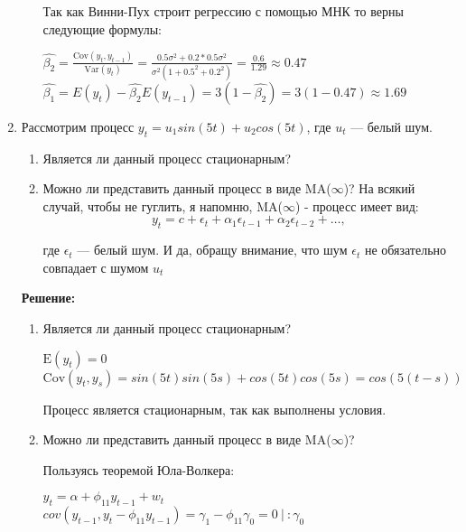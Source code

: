 \documentclass[a4paper,14pt]{article}
\begin{document}
\begin{enumerate}
\begin{enumerate}
Так как Винни-Пух строит регрессию с помощью МНК то верны следующие формулы:

\begin{center}
	\begin{spacing}{1.5}
		$\hat{\beta_2} = \frac{\text{Cov}(y_t,y_{t-1})}{\text{Var}(y_t)} = \frac{0.5\sigma^2+0.2*0.5\sigma^2}{\sigma^2(1+0.5^2+0.2^2)} = \frac{0.6}{1.29} \approx 0.47$\\
		$\hat{\beta_1} = E(y_t) - \hat{\beta_2}E(y_{t-1}) = 3(1-\hat{\beta_2}) = 3(1-0.47) \approx 1.69$

	\end{spacing}
\end{center}
\end{enumerate}
\item Рассмотрим процесс $y_t = u_1sin(5t) + u_2cos(5t)$, где $u_t$ — белый шум.
\begin{enumerate}
	\item Является ли данный процесс стационарным?
	\item Можно ли представить данный процесс в виде MA($\infty$)? На всякий случай, чтобы не гуглить, я напомню, MA($\infty$) - процесс имеет вид:
	$$y_t = c+\epsilon_t +\alpha_1\epsilon_{t−1} +\alpha_2\epsilon_{t−2} +\dots,$$
	
	где $\epsilon_t$ — белый шум. И да, обращу внимание, что шум $\epsilon_t$ не обязательно совпадает с шумом $u_t$

\end{enumerate}
\textbf{Решение:}
\begin{enumerate}
	\item Является ли данный процесс стационарным?
\begin{center}
	\begin{spacing}{1.5}
		$\text{E}(y_t) = 0$\\
		$\text{Cov}(y_t,y_s) = sin(5t)sin(5s)+cos(5t)cos(5s) = cos(5(t-s))$
	\end{spacing}
\end{center}

Процесс является стационарным, так как выполнены условия.
	\item Можно ли представить данный процесс в виде MA($\infty$)?

Пользуясь теоремой Юла-Волкера:
\begin{center}
	\begin{spacing}{1.5}
		$y_t = \alpha +\phi_{11}y_{t-1}+w_t$\\

		$cov(y_{t-1}, y_t - \phi_{11} y_{t-1}) = \gamma_1 - \phi_{11} \gamma_0 = 0 \ |\ : \gamma_0$ \\
		

\end{spacing}
\end{center}
\end{enumerate}
\end{enumerate}
\end{document}
